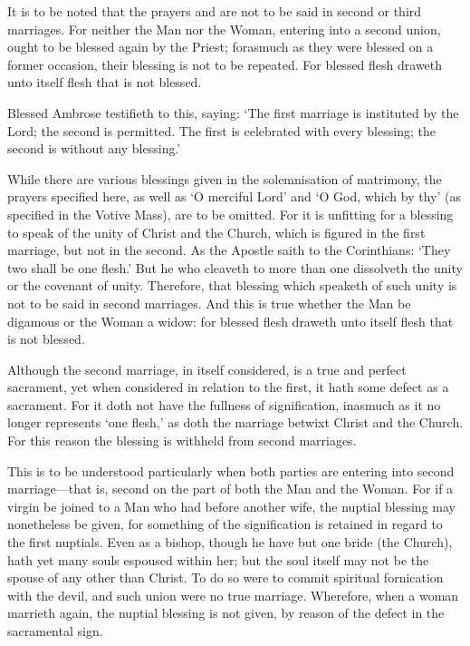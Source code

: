\begin{rubric}
	It is to be noted that the prayers  and  are not to be said in second or third marriages. For neither the Man nor the Woman, entering into a second union, ought to be blessed again by the Priest; forasmuch as they were blessed on a former occasion, their blessing is not to be repeated. For blessed flesh draweth unto itself flesh that is not blessed.\par
	Blessed Ambrose testifieth to this, saying: `The first marriage is instituted by the Lord; the second is permitted. The first is celebrated with every blessing; the second is without any blessing.'
\end{rubric}
\begin{rubric}
	While there are various blessings given in the solemnisation of matrimony, the prayers specified here, as well as `O merciful Lord' and `O God, which by thy' (as specified in the Votive Mass), are to be omitted. For it is unfitting for a blessing to speak of the unity of Christ and the Church, which is figured in the first marriage, but not in the second. As the Apostle saith to the Corinthians: `They two shall be one flesh.' But he who cleaveth to more than one dissolveth the unity or the covenant of unity. Therefore, that blessing which speaketh of such unity is not to be said in second marriages. And this is true whether the Man be digamous or the Woman a widow: for blessed flesh draweth unto itself flesh that is not blessed.
\end{rubric}
\begin{rubric}
	Although the second marriage, in itself considered, is a true and perfect sacrament, yet when considered in relation to the first, it hath some defect as a sacrament. For it doth not have the fullness of signification, inasmuch as it no longer represents `one flesh,' as doth the marriage betwixt Christ and the Church. For this reason the blessing is withheld from second marriages.\par
	This is to be understood particularly when both parties are entering into second marriage---that is, second on the part of both the Man and the Woman. For if a virgin be joined to a Man who had before another wife, the nuptial blessing may nonetheless be given, for something of the signification is retained in regard to the first nuptials. Even as a bishop, though he have but one bride (the Church), hath yet many souls espoused within her; but the soul itself may not be the spouse of any other than Christ. To do so were to commit spiritual fornication with the devil, and such union were no true marriage. Wherefore, when a woman marrieth again, the nuptial blessing is not given, by reason of the defect in the sacramental sign.
\end{rubric}

